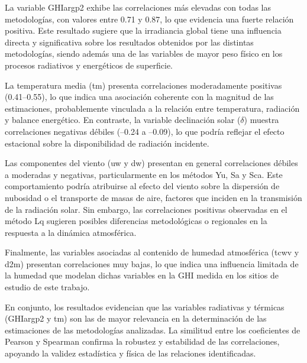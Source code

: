 \documentclass[letterpaper,12pt, twoside]{report}
\providecommand{\DIFdeltex}[1]{{\protect\color{red} \scriptsize #1}} %
\providecommand{\DIFdel}[1]{\texorpdfstring{\DIFdeltex{#1}}{}} %
\begin{document}
\DIFdel{La variable GHIargp2 exhibe las correlaciones más elevadas con todas las metodologías, con valores entre 0.71 y 0.87, lo que evidencia una fuerte relación positiva. Este resultado sugiere que la irradiancia global tiene una influencia directa y significativa sobre los resultados obtenidos por las distintas metodologías, siendo además una de las variables de mayor peso físico en los procesos radiativos y energéticos de superficie.
}%

\DIFdel{La temperatura media (tm) presenta correlaciones moderadamente positivas (0.41–0.55), lo que indica una asociación coherente con la magnitud de las estimaciones, probablemente vinculada a la relación entre temperatura, radiación y balance energético. En contraste, la variable declinación solar ($\delta$) muestra correlaciones negativas débiles (–0.24 a –0.09), lo que podría reflejar el efecto estacional sobre la disponibilidad de radiación incidente.
}%

\DIFdel{Las componentes del viento (uw y dw) presentan en general correlaciones débiles a moderadas y negativas, particularmente en los métodos Yu, Sa y Sca. Este comportamiento podría atribuirse al efecto del viento sobre la dispersión de nubosidad o el transporte de masas de aire, factores que inciden en la transmisión de la radiación solar. Sin embargo, las correlaciones positivas observadas en el método Lq sugieren posibles diferencias metodológicas o regionales en la respuesta a la dinámica atmosférica.
}%

\DIFdel{Finalmente, las variables asociadas al contenido de humedad atmosférica (tcwv y d2m) presentan correlaciones muy bajas, lo que indica una influencia limitada de la humedad que modelan dichas variables en la GHI medida en los sitios de estudio de este trabajo.
}%

\DIFdel{En conjunto, los resultados evidencian que las variables radiativas y térmicas (GHIargp2 y tm) son las de mayor relevancia en la determinación de las estimaciones de las metodologías analizadas. La similitud entre los coeficientes de Pearson y Spearman confirma la robustez y estabilidad de las correlaciones, apoyando la validez estadística y física de las relaciones identificadas.
}%
\end{document}
